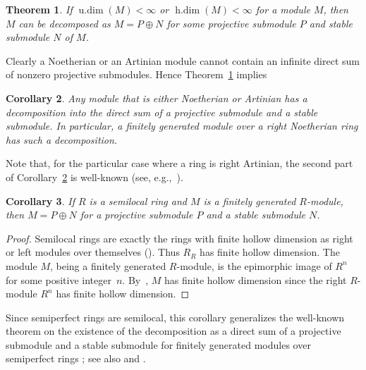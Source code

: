 \documentclass[11pt,a4paper]{amsart}
\theoremstyle{plain}
\newtheorem{theorem}{Theorem}[section]
\newtheorem{corollary}[theorem]{Corollary}
\theoremstyle{definition}
\theoremstyle{remark}
\newcommand{\udim}{\operatorname{u.dim}}
\newcommand{\hdim}{\operatorname{h.dim}}
\begin{document}
\begin{theorem}
\label{Cor:Decomposition-hold-for-finite-udim-hdim}
If $\udim(M)<\infty $ or $\hdim(M)< \infty$ for a module $ M $, then $M$ can be decomposed as $M=P \oplus N$
for some projective submodule $ P $ and stable submodule $ N $ of $ M $.
\end{theorem}

Clearly a Noetherian or an Artinian module cannot contain an infinite direct sum of nonzero projective submodules. Hence Theorem~\ref{Cor:Decomposition-hold-for-finite-udim-hdim} implies

\begin{corollary}\label{Cor:Noetherian-Artinian-Modules-Decompose}
Any module that is either Noetherian or Artinian has a decomposition into the direct sum of a projective submodule and a stable submodule. In particular, a finitely generated module over a right Noetherian ring has such a decomposition.
\end{corollary}

Note that, for the particular case where a ring is right Artinian, the second part of Corollary~\ref{Cor:Noetherian-Artinian-Modules-Decompose} is well-known (see, e.g.,~\cite[p. 104, after Proposition 1.6]{Auslander-Reiten-Smalo:RepresentationTheoryOfArtinAlgebras}).

{\begin{corollary} \label{corollary 3.2.3} If $R$ is a semilocal ring and $ M $ is a finitely generated $R$-module, then   $M=P\oplus N$ for a projective submodule $P$ and a stable submodule $N$.
\end{corollary}}
\begin{proof}
Semilocal rings are exactly the rings with finite hollow dimension as right or left modules over themselves (\cite[Proposition 2.43]{Facchini:ModuleTheory}). Thus $ R_R $ has finite hollow dimension. The module $M$, being a finitely generated $R$-module, is the epimorphic image of $R^n$ for some positive integer~$ n $. By~\cite[Proposition 2.42]{Facchini:ModuleTheory}, $ M $ has finite hollow dimension since the right $ R $-module $ R^n $ has finite hollow dimension.
\end{proof}

Since semiperfect rings are semilocal, this corollary
generalizes the well-known theorem on the existence of the decomposition as a direct sum of a projective submodule and a stable submodule for finitely generated modules over semiperfect rings \cite[Theorem 1.4]{Warfield:SerialRingsAndFinitelyPresentedModules}; see also \cite[Theorem 3.15]{Facchini:ModuleTheory} and \cite{Martsinkovsky:1TorsionOfFiniteModulesOverSemiperfectRings}.
\end{document}
